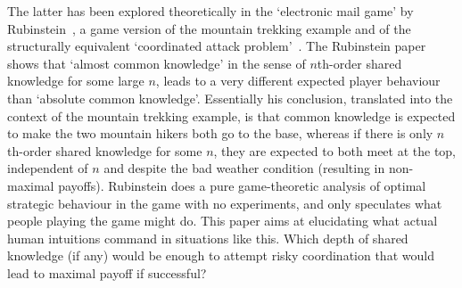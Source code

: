 The latter has been explored theoretically in the  `electronic mail game' by Rubinstein~\cite{rubinstein1989electronic}, a game version of the mountain trekking example and of the structurally equivalent `coordinated attack problem'~\cite{fagin1995reasoning}. The Rubinstein paper shows that `almost common knowledge' in the sense of $n$th-order shared knowledge for some large $n$, leads to a very different expected player behaviour than `absolute common knowledge'. Essentially his conclusion, translated into the context of the mountain trekking example, is that common knowledge is expected to make the two mountain hikers both go to the base, whereas if there is only $n$th-order shared knowledge for some $n$, they are expected to both meet at the top, independent of $n$ and despite the bad weather condition (resulting in non-maximal payoffs). Rubinstein does a pure game-theoretic analysis of optimal strategic behaviour in the game with no experiments, and only speculates what people playing the game might do. This paper aims at elucidating what actual human intuitions command in situations like this. Which depth of shared knowledge (if any) would be enough to attempt risky coordination that would lead to maximal payoff if successful? 

